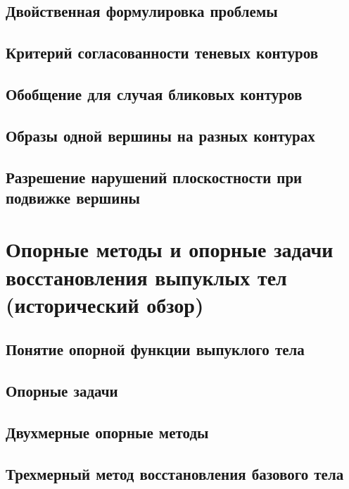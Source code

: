 \documentclass[a4paper, 12pt, titlepage]{article}
\theoremstyle{definition}
\theoremstyle{plain}
\theoremstyle{plain}
\begin{document}
\subsection{Двойственная формулировка проблемы}

\subsection{Критерий согласованности теневых контуров}

\subsection{Обобщение для случая бликовых контуров}

\subsection{Образы одной вершины на разных контурах}

\subsection{Разрешение нарушений плоскостности при подвижке вершины}


\section{Опорные методы и опорные задачи восстановления выпуклых
тел (исторический обзор)}

\subsection{Понятие опорной функции выпуклого тела}

\subsection{Опорные задачи}

\subsection{Двухмерные опорные методы}

\subsection{Трехмерный метод восстановления базового тела}
\end{document}
